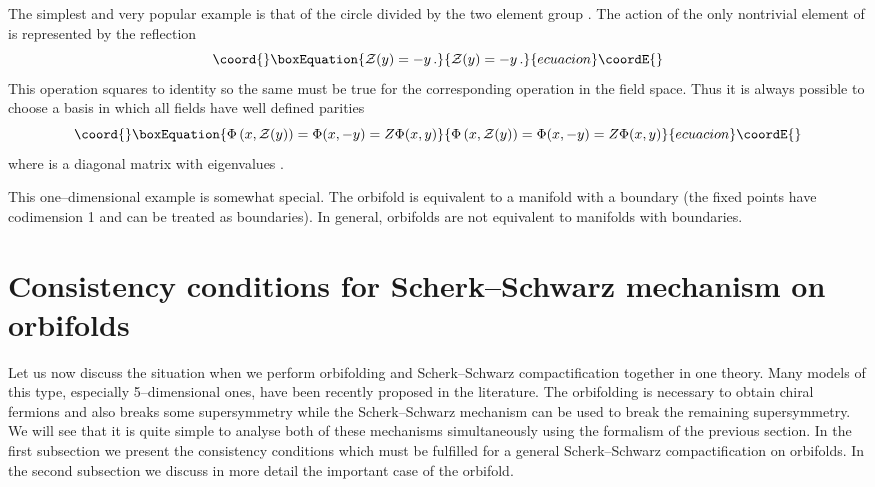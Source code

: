 \documentclass[a4paper,12pt]{article}
\def\cZ{{\cal Z}}
\def\ZZ{\mathbb Z}
\begin{document}
The simplest and very popular example is that of the circle \coordHE{}
divided by the two element group \myHighlight{$\ZZ_2$}\coordHE{}. The action of the only
nontrivial element of \myHighlight{$\ZZ_2$}\coordHE{} is represented by the reflection
\begin{equation}\coord{}\boxEquation{
\cZ(y)=-y
\,.
}{
\cZ(y)=-y
\,.
}{ecuacion}\coordE{}\end{equation}
This operation squares to identity so the same must be true for the
corresponding operation \coordHE{} in the field space. Thus it is always
possible to choose a basis in which all fields have well defined
parities
\begin{equation}\coord{}\boxEquation{
\Phi\left(x,\cZ(y)\right)=\Phi(x,-y)=Z\Phi(x,y)
}{
\Phi\left(x,\cZ(y)\right)=\Phi(x,-y)=Z\Phi(x,y)
}{ecuacion}\coordE{}\end{equation}
where \coordHE{} is a diagonal matrix with eigenvalues \coordHE{}.

This one--dimensional example is somewhat special. The orbifold
\myHighlight{$S^1/\ZZ_2$}\coordHE{} is equivalent to a manifold with a boundary (the fixed
points have codimension 1 and can be treated as boundaries).
In general, orbifolds are not equivalent to manifolds with
boundaries. 




\section{Consistency conditions for Scherk--Schwarz mechanism on
orbifolds} 


Let us now discuss the situation when we perform orbifolding and 
Scherk--Schwarz compactification together in one theory. 
Many models of this type, especially 5--dimensional ones, have been
recently proposed in the literature. The orbifolding is necessary to
obtain chiral fermions and also breaks some supersymmetry while the
Scherk--Schwarz mechanism can be used to break the remaining
supersymmetry. We will see that it is quite simple to analyse 
both of these mechanisms simultaneously using the formalism of the
previous section. In the first subsection we present the
consistency conditions which must be fulfilled for a general
Scherk--Schwarz compactification on orbifolds. In the second
subsection we discuss in more detail the important case of the
\myHighlight{$S^1/\ZZ_2$}\coordHE{} orbifold.
\end{document}
